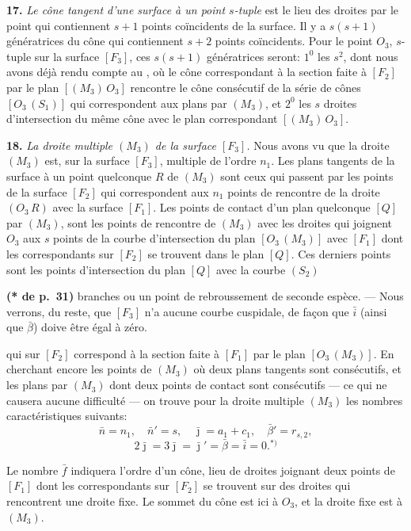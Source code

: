 \documentclass{article}
\begin{document}
\textbf{17.} \emph{Le cône tangent d'une surface à un point $s$-tuple} est le lieu des droites par le point qui contiennent $s + 1$ points coïncidents de la surface. Il y a $s(s + 1)$ génératrices du cône qui contiennent $s + 2$ points coïncidents. Pour le point $O_3$, $s$-tuple sur la surface $[F_3]$, ces $s(s + 1)$ génératrices seront: $1^0$ les $s^2$, dont nous avons déjà rendu compte au , où le cône correspondant à la section faite à $[F_2]$ par le plan $[(M_3)\,O_3]$ rencontre le cône consécutif de la série de cônes $[O_3\,(S_1)]$ qui correspondent aux plans par $(M_3)$, et $2^0$ les $s$ droites d'intersection du même cône avec le plan correspondant $[(M_3)\,O_3]$.

\textbf{18.} \emph{La droite multiple $(M_3)$ de la surface $[F_3]$.} Nous avons vu que la droite $(M_3)$ est, sur la surface $[F_3]$, multiple de l'ordre $n_1$. Les plans tangents de la surface à un point quelconque $R$ de $(M_3)$ sont ceux qui passent par les points de la surface $[F_2]$ qui correspondent aux $n_1$ points de rencontre de la droite $(O_3\,R)$ avec la surface $[F_1]$. Les points de contact d'un plan quelconque $[Q]$ par $(M_3)$, sont les points de rencontre de $(M_3)$ avec les droites qui joignent $O_3$ aux $s$ points de la courbe d'intersection du plan $[O_3\,(M_3)]$ avec $[F_1]$ dont les correspondants sur $[F_2]$ se trouvent dans le plan $[Q]$. Ces derniers points sont les points d'intersection du plan $[Q]$ avec la courbe $(S_2)$

\textbf{(* de p.~31)} branches ou un point de rebroussement de seconde espèce. --- Nous verrons, du reste, que $[F_3]$ n'a aucune courbe cuspidale, de façon que $\bar{i}$ (ainsi que $\bar{\beta}$) doive être égal à zéro.

qui sur $[F_2]$ correspond à la section faite à $[F_1]$ par le plan $[O_3\,(M_3)]$. En cherchant encore les points de $(M_3)$ où deux plans tangents sont consécutifs, et les plans par $(M_3)$ dont deux points de contact sont consécutifs --- ce qui ne causera aucune difficulté --- on trouve pour la droite multiple $(M_3)$ les nombres caractéristiques suivants:
\[
\bar{n} = n_1, \quad \bar{n}' = s, \quad \bar{\jmath} = a_1 + c_1, \quad \bar{\beta}' = r_{s, 2},
\]
\[
2\bar{\jmath} = 3\bar{\jmath} = \bar{\jmath}' = \bar{\beta} = \bar{i} = 0.{}^{*)}
\]

Le nombre $\bar{f}$ indiquera l'ordre d'un cône, lieu de droites joignant deux points de $[F_1]$ dont les correspondants sur $[F_2]$ se trouvent sur des droites qui rencontrent une droite fixe. Le sommet du cône est ici à $O_3$, et la droite fixe est à $(M_3)$.
\end{document}
